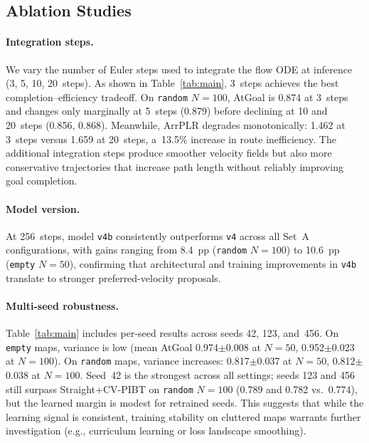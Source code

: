 \subsection{Ablation Studies}\label{sec:ablation}

\paragraph{Integration steps.}
We vary the number of Euler steps used to integrate the flow ODE
at inference (3, 5, 10, 20~steps).
As shown in Table~\ref{tab:main}, 3~steps achieves the best
completion--efficiency tradeoff.
On \texttt{random} $N\!=\!100$, AtGoal is 0.874 at 3~steps and
changes only marginally at 5~steps (0.879) before declining at
10 and 20~steps (0.856, 0.868).
Meanwhile, ArrPLR degrades monotonically: 1.462 at 3~steps
versus 1.659 at 20~steps, a~13.5\% increase in route inefficiency.
The additional integration steps produce smoother velocity fields
but also more conservative trajectories that increase path length
without reliably improving goal completion.

\paragraph{Model version.}
At 256~steps, model \texttt{v4b} consistently outperforms
\texttt{v4} across all Set~A configurations,
with gains ranging from 8.4~pp (\texttt{random} $N\!=\!100$)
to 10.6~pp (\texttt{empty} $N\!=\!50$), confirming that architectural
and training improvements in \texttt{v4b} translate to stronger
preferred-velocity proposals.

\paragraph{Multi-seed robustness.}
Table~\ref{tab:main} includes per-seed results across
seeds 42, 123, and~456.
On \texttt{empty} maps, variance is low
(mean AtGoal 0.974$\pm$0.008 at $N\!=\!50$,
0.952$\pm$0.023 at $N\!=\!100$).
On \texttt{random} maps, variance increases:
0.817$\pm$0.037 at $N\!=\!50$, 0.812$\pm$0.038 at $N\!=\!100$.
Seed~42 is the strongest across all settings;
seeds 123 and 456 still surpass Straight+CV-PIBT on
\texttt{random} $N\!=\!100$ (0.789 and 0.782 vs.\ 0.774),
but the learned margin is modest for retrained seeds.
This suggests that while the learning signal is consistent,
training stability on cluttered maps warrants further investigation
(e.g., curriculum learning or loss landscape smoothing).

